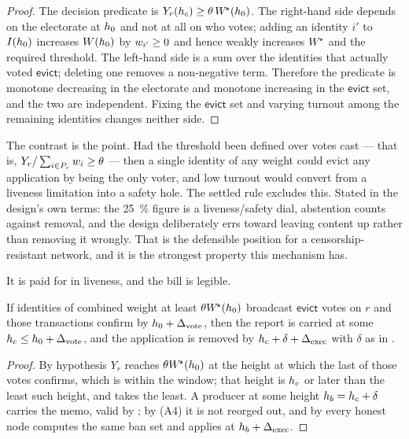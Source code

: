 \begin{proof}
The decision predicate is $Y_r(h_c) \ge \theta\,W^{\!\star}(h_0)$. The right-hand side
depends on the electorate at $h_0$ and not at all on who votes; adding an identity $i'$ to
$I(h_0)$ increases $W(h_0)$ by $w_{i'} \ge 0$ and hence weakly increases
$W^{\!\star}$ and the required threshold. The left-hand side is a sum over the identities that
actually voted $\mathsf{evict}$; deleting one removes a non-negative term. Therefore the predicate
is monotone decreasing in the electorate and monotone increasing in the $\mathsf{evict}$ set, and
the two are independent. Fixing the $\mathsf{evict}$ set and varying turnout among the remaining
identities changes neither side.
\end{proof}

The contrast is the point. Had the threshold been defined over votes cast — that is,
$Y_r / \sum_{i \in P_r} w_{i} \ge \theta$ — then a single identity of any weight could evict
any application by being the only voter, and low turnout would convert from a liveness limitation
into a safety hole. The settled rule excludes this. Stated in the design's own terms: the
\SI{25}{\percent} figure is a liveness/safety dial, abstention counts against removal, and the
design deliberately errs toward leaving content up rather than removing it wrongly. That is the
defensible position for a censorship-resistant network, and it is the strongest property this
mechanism has.

It is paid for in liveness, and the bill is legible.

\begin{proposition}[Liveness]
\label{prop:23:liveness}
If identities of combined weight at least $\theta W^{\!\star}(h_0)$ broadcast
$\mathsf{evict}$ votes on $r$ and those transactions confirm by
$h_0 + \Delta_{\mathrm{vote}}$, then the report is carried at some
$h_c \le h_0 + \Delta_{\mathrm{vote}}$, and the application is removed by
$h_c + \delta + \Delta_{\mathrm{exec}}$ with $\delta$ as in
.
\end{proposition}

\begin{proof}
By hypothesis $Y_r$ reaches $\theta W^{\!\star}(h_0)$ at the height at which the last of
those votes confirms, which is within the window; that height is $h_c$ or later than the least
such height, and  takes the least. A producer at some height
$h_b = h_c + \delta$ carries the memo, valid by ; by (A4) it is not reorged
out, and by  every honest node computes the same ban set and applies
 at $h_b + \Delta_{\mathrm{exec}}$.
\end{proof}

